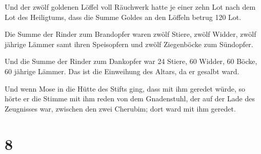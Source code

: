  Und der zwölf goldenen Löffel voll Räuchwerk hatte je
einer zehn Lot nach dem Lot des Heiligtums, dass die Summe Goldes an den
Löffeln betrug 120 Lot.

 Die Summe der Rinder zum Brandopfer waren zwölf Stiere,
zwölf Widder, zwölf jährige Lämmer samt ihren Speisopfern und zwölf
Ziegenböcke zum Sündopfer.

 Und die Summe der Rinder zum Dankopfer war 24 Stiere, 60
Widder, 60 Böcke, 60 jährige Lämmer. Das ist die Einweihung des Altars,
da er gesalbt ward.

 Und wenn Mose in die Hütte des Stifts ging, dass mit ihm
geredet würde, so hörte er die Stimme mit ihm reden von dem Gnadenstuhl,
der auf der Lade des Zeugnisses war, zwischen den zwei Cherubim; dort
ward mit ihm geredet.

\hypertarget{section-7}{%
\section{8}\label{section-7}}

